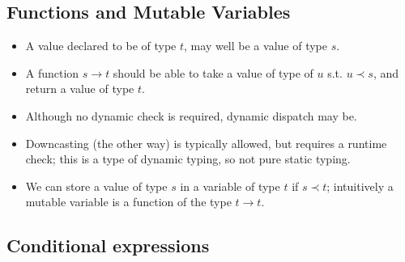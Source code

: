 \subsection{Functions and Mutable Variables}

\begin{itemize}

\item A value declared to be of type $t$, may well be a value of type $s$.

\item A function $s \rightarrow t$ should be able to take a value of type of
$u$ s.t. $u \prec s$, and return a value of type $t$.

\item Although no dynamic check is required, dynamic dispatch may be.

\item Downcasting (the other way) is typically allowed, but requires a runtime
check; this is a type of dynamic typing, so not pure static typing.

\item We can store a value of type $s$ in a variable of type $t$ if $s \prec
t$; intuitively a mutable variable is a function of the type $t \rightarrow t$.

\end{itemize}

\subsection{Conditional expressions}

